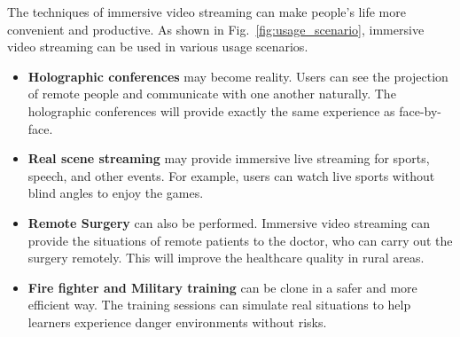 The techniques of immersive video streaming can make people's life more convenient and productive.
As shown in Fig.~\ref{fig:usage_scenario}, immersive video streaming can be used in various usage scenarios.
\begin{itemize}
    \item {\bf Holographic conferences} may become reality. 
    Users can see the projection of remote people and communicate with  one another naturally.
    The holographic conferences will provide exactly the same experience as face-by-face.
    \item {\bf Real scene streaming} may provide immersive live streaming for sports, speech, and other events. 
    For example, users can watch live sports without blind angles to enjoy the games.
    \item {\bf Remote Surgery} can also be performed. 
    Immersive video streaming can provide the situations of remote patients to 
    the doctor, who can carry out the surgery remotely. This will improve the healthcare quality in rural areas.
    \item {\bf Fire fighter and Military training} can be clone in a safer and more efficient way. 
    The training sessions can simulate real situations to help learners experience danger environments without risks.
\end{itemize}


